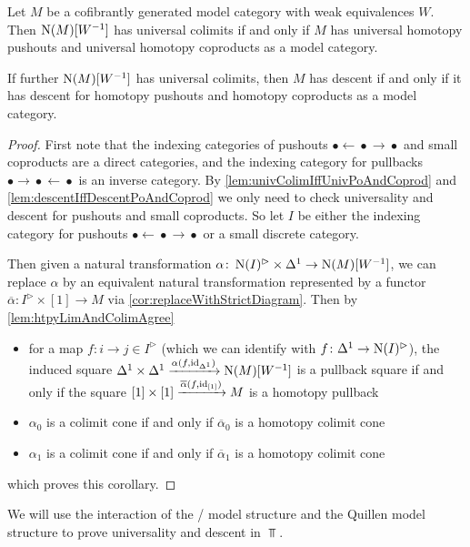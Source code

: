 \begin{corollary}\label{cor:sufficientToProveInModCat}
    Let $M$ be a cofibrantly generated model category with weak equivalences $W$. 
    Then $\operatorname{N}(M)[W^{-1}]$ has universal colimits if and only if $M$ has universal homotopy pushouts and universal homotopy coproducts as a model category.
    
    If further $\operatorname{N}(M)[W^{-1}]$ has universal colimits, then $M$ has descent if and only if it has descent for homotopy pushouts and homotopy coproducts as a model category.
    \begin{proof}
        First note that the indexing categories of pushouts $\bullet\xleftarrow{}\bullet\xrightarrow{}\bullet$ and small coproducts are a direct categories, and the indexing category for pullbacks $\bullet\xrightarrow{}\bullet\xleftarrow{}\bullet$ is an inverse category.
        By \cref{lem:univColimIffUnivPoAndCoprod} and \cref{lem:descentIffDescentPoAndCoprod} we only need to check universality and descent for pushouts and small coproducts.
        So let $I$ be either the indexing category for pushouts $\bullet\xleftarrow{}\bullet\xrightarrow{}\bullet$ or a small discrete category.

        Then given a natural transformation $\alpha\colon\operatorname{N}(I)^{\rhd}\times\Delta^1\to\operatorname{N}(M)[W^{-1}]$, we can replace $\alpha$ by an equivalent natural transformation represented by a functor $\overline{\alpha}\colon I^{\rhd}\times[1]\to M$ via \cref{cor:replaceWithStrictDiagram}.
        Then by \cref{lem:htpyLimAndColimAgree}
        \begin{itemize}
            \item for a map $f\colon i\to j\in I^{\rhd}$ (which we can identify with $f\colon\Delta^1\to\operatorname{N}(I)^{\rhd}$), the induced square $\Delta^1\times\Delta^1\xrightarrow{\alpha(f,\text{id}_{\Delta^1})}\operatorname{N}(M)[W^{-1}]$ is a pullback square if and only if the square $[1]\times[1]\xrightarrow{\overline{\alpha}(f,\text{id}_{[1]})}M$ is a homotopy pullback
            \item $\alpha_0$ is a colimit cone if and only if $\overline{\alpha}_0$ is a homotopy colimit cone
            \item $\alpha_1$ is a colimit cone if and only if $\overline{\alpha}_1$ is a homotopy colimit cone
        \end{itemize}
        which proves this corollary.
    \end{proof}
\end{corollary}
We will use the interaction of the \Strom/ model structure and the Quillen model structure to prove universality and descent in $\Top$.
